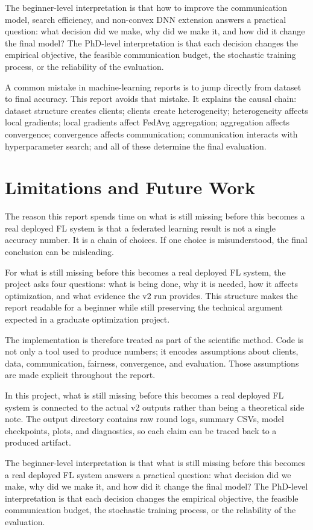 \documentclass[11pt]{report}
\begin{document}
The beginner-level interpretation is that how to improve the communication model, search efficiency,
and non-convex DNN extension answers a practical question: what decision did we make, why did we
make it, and how did it change the final model? The PhD-level interpretation is that each decision
changes the empirical objective, the feasible communication budget, the stochastic training process,
or the reliability of the evaluation.

A common mistake in machine-learning reports is to jump directly from dataset to final accuracy.
This report avoids that mistake. It explains the causal chain: dataset structure creates clients;
clients create heterogeneity; heterogeneity affects local gradients; local gradients affect FedAvg
aggregation; aggregation affects convergence; convergence affects communication; communication
interacts with hyperparameter search; and all of these determine the final evaluation.

\chapter{Limitations and Future Work}
The reason this report spends time on what is still missing before this becomes a real deployed FL
system is that a federated learning result is not a single accuracy number. It is a chain of
choices. If one choice is misunderstood, the final conclusion can be misleading.

For what is still missing before this becomes a real deployed FL system, the project asks four
questions: what is being done, why it is needed, how it affects optimization, and what evidence the
v2 run provides. This structure makes the report readable for a beginner while still preserving the
technical argument expected in a graduate optimization project.

The implementation is therefore treated as part of the scientific method. Code is not only a tool
used to produce numbers; it encodes assumptions about clients, data, communication, fairness,
convergence, and evaluation. Those assumptions are made explicit throughout the report.

In this project, what is still missing before this becomes a real deployed FL system is connected to
the actual v2 outputs rather than being a theoretical side note. The output directory contains raw
round logs, summary CSVs, model checkpoints, plots, and diagnostics, so each claim can be traced
back to a produced artifact.

The beginner-level interpretation is that what is still missing before this becomes a real deployed
FL system answers a practical question: what decision did we make, why did we make it, and how did
it change the final model? The PhD-level interpretation is that each decision changes the empirical
objective, the feasible communication budget, the stochastic training process, or the reliability of
the evaluation.
\end{document}
